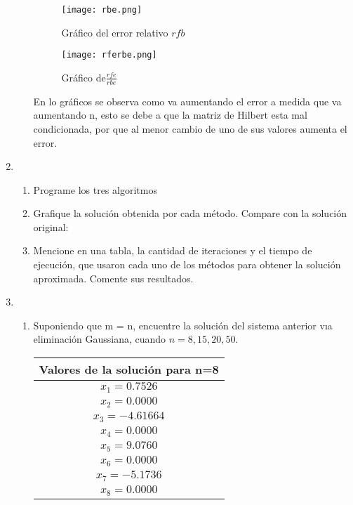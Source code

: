 \documentclass{udpreport}
\begin{document}
\begin{enumerate}
\begin{enumerate}
 			\begin{figure}[H]
 				\centering
 				\texttt{[image: rbe.png]}
 				\caption{Gráfico del error relativo $rfb$}		
 			\end{figure}
 			
 			\begin{figure}[H]
 				\centering
 				\texttt{[image: rferbe.png]}
 				\caption{Gráfico de$\frac{rfe}{rbe}$}
	
 			\end{figure}
 		
 			
 			En lo gráficos se observa como va aumentando el error a  medida que va aumentando n, esto se debe a que la matriz de Hilbert esta mal condicionada, por que al menor cambio de uno de sus valores aumenta el error.
 		\end{enumerate}
 		
 	
 	\newpage
 		\item
 	 \begin{enumerate}
 	 
 	    \item Programe los tres algoritmos
 	    \item  Grafique la solución obtenida por cada método. Compare con la solución original:
 	    \item Mencione en una tabla, la cantidad de iteraciones y el tiempo de ejecución, que usaron cada uno de los métodos para obtener la solución aproximada. Comente sus resultados.
 	  \end{enumerate}
      
        \item
                \begin{enumerate}
            \item Suponiendo que m = n, encuentre la solución del sistema anterior vıa eliminación Gaussiana, cuando $n = 8, 15, 20, 50$.
            \begin{table}[H]
        \centering
            \begin{tabular} {|c|}
            \hline
            Valores de la solución para n=8 \\
            \hline
            $x_{1}=  0.7526$\\
            \hline
            $x_{2}=   0.0000$\\
            \hline
            $x_{3}=  -4.61664$\\
            \hline
            $x_{4}=  0.0000$\\
            \hline
            $x_{5}=  9.0760$\\
            \hline
            $x_{6}=   0.0000$\\
            \hline
            $x_{7}=  -5.1736$\\
            \hline
            $x_{8}=  0.0000$\\
            \hline
            \end{tabular}
        \end{table}
        

\end{enumerate}
\end{enumerate}
\end{document}
